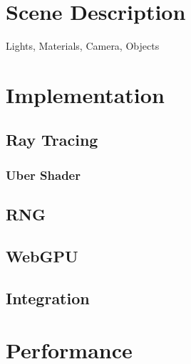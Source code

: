 
\section{Scene Description}
Lights, Materials, Camera, Objects
\section{Implementation}
\subsection{Ray Tracing}
\subsubsection{Uber Shader}
\subsection{RNG}
\subsection{WebGPU}
\subsection{Integration}
\section{Performance}